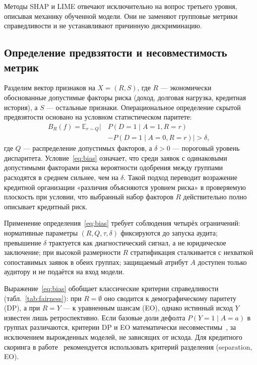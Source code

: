 \documentclass{misisarticle}
\begin{document}
Методы SHAP и LIME отвечают исключительно на вопрос третьего уровня, описывая механику обученной модели. Они не заменяют групповые метрики справедливости и не устанавливают причинную дискриминацию.

\subsection{Определение предвзятости и несовместимость метрик}

Разделим вектор признаков на $X = (R, S)$, где $R$ — экономически обоснованные допустимые факторы риска (доход, долговая нагрузка, кредитная история), а $S$ — остальные признаки. Операциональное определение скрытой предвзятости основано на условном статистическом паритете:
\begin{equation}
\begin{aligned}
B_R(f) = \mathbb{E}_{r \sim Q}\bigl|\,&P(D = 1 \mid A = 1, R = r) \\
&- P(D = 1 \mid A = 0, R = r)\bigr| > \delta,
\end{aligned}
\label{eq:bias}
\end{equation}
где $Q$ — распределение допустимых факторов, а $\delta > 0$ — пороговый уровень диспаритета. Условие~\eqref{eq:bias} означает, что среди заявок с одинаковыми допустимыми факторами риска вероятности одобрения между группами расходятся в среднем сильнее, чем на $\delta$. Такой подход переводит возражение кредитной организации «различия объясняются уровнем риска» в проверяемую плоскость при условии, что выбранный набор факторов $R$ действительно полно описывает кредитный риск.

Применение определения~\eqref{eq:bias} требует соблюдения четырёх ограничений: нормативные параметры $(R, Q, \tau, \delta)$ фиксируются до запуска аудита; превышение $\delta$ трактуется как диагностический сигнал, а не юридическое заключение; при высокой размерности $R$ стратификация сталкивается с нехваткой сопоставимых заявок в обеих группах; защищаемый атрибут $A$ доступен только аудитору и не подаётся на вход модели.

Выражение~\eqref{eq:bias} обобщает классические критерии справедливости (табл.~\ref{tab:fairness}): при $R = \emptyset$ оно сводится к демографическому паритету (DP), а при $R = Y$ — к уравненным шансам (EO), однако истинный исход $Y$ известен лишь ретроспективно. Если базовые доли дефолта $P(Y = 1 \mid A = a)$ в группах различаются, критерии DP и EO математически несовместимы~\cite{hardt2016, verma2018}, за исключением вырожденных моделей, не зависящих от исхода. Для кредитного скоринга в работе~\cite{kozodoi2022} рекомендуется использовать критерий разделения (separation, EO).
\end{document}
